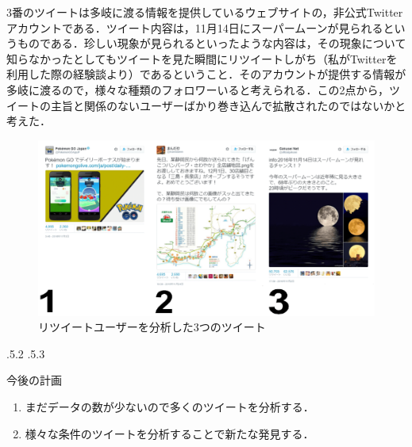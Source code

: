\documentclass[uplatex]{jsarticle}
\makeatletter
\renewcommand{\section}{%
    \if@slide\clearpage\fi
    \@startsection{section}{1}{\z@}%
    {\Cvs \@plus.5\Cdp \@minus.2\Cdp}%
    {.5\Cvs \@plus.3\Cdp}%
    {\normalfont\raggedright}}
\makeatother
\begin{document}
3番のツイートは多岐に渡る情報を提供しているウェブサイトの，非公式Twitterアカウントである．ツイート内容は，11月14日にスーパームーンが見られるというものである．珍しい現象が見られるといったような内容は，その現象について知らなかったとしてもツイートを見た瞬間にリツイートしがち（私がTwitterを利用した際の経験談より）であるということ．そのアカウントが提供する情報が多岐に渡るので，様々な種類のフォロワーいると考えられる．この2点から，ツイートの主旨と関係のないユーザーばかり巻き込んで拡散されたのではないかと考えた．

\begin{figure}[h]
\centering
\includegraphics[width=15cm]{g1.pdf}
\caption{リツイートユーザーを分析した3つのツイート}\label{ツイート}
\end{figure}

\section{今後の計画}
\begin{enumerate}
\item まだデータの数が少ないので多くのツイートを分析する．
\item 様々な条件のツイートを分析することで新たな発見する．
\end{enumerate}


\end{document}
